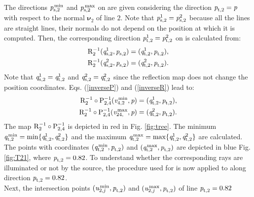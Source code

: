  The directions
$\textit{p}_{\textrm{s,} \textit{$2$}}^\textrm{\,min}$ and $\textit{p}_{\textrm{s,} \textit{$2$}}^\textrm{\,max} $ on 
are given considering the direction $\textit{p}_{\textrm{t,} \textit{$2$}} = \textit{p}_{\textrm{} \textit{}}$ with respect to the normal
$\boldsymbol{\nu}_{2}$ of line $2$.
 Note that $\textit{p}_{\textrm{s,} \textit{$2$}}^1=\textit{p}_{\textrm{s,} \textit{$2$}}^2$ because all the lines are straight lines, their normals do not depend on the position at which it is computed.
 Then, the corresponding direction $\textit{p}_{\textrm{t,} \textit{$2$}}^1=\textit{p}_{\textrm{t,} \textit{$2$}}^2$ on 
 is calculated from:
\begin{equation}\label{inverseR}
\begin{split}
\mathrm{R}_{{2}}^{-1}(\textit{q}_{\textrm{s,} \textit{$2$}}^1, \textit{p}_{\textrm{s,} \textit{$2$}}) &= (\textit{q}_{\textrm{t,} \textit{$2$}}^1, \textit{p}_{\textrm{t,} \textit{$2$}}), \\
\mathrm{R}_{{2}}^{-1}(\textit{q}_{\textrm{s,} \textit{$2$}}^2, \textit{p}_{\textrm{s,} \textit{$2$}}) &= (\textit{q}_{\textrm{t,} \textit{$2$}}^2, \textit{p}_{\textrm{t,} \textit{$2$}}).
\end{split}
\end{equation}
Note that $\textit{q}_{\textrm{s,} \textit{$2$}}^1 = \textit{q}_{\textrm{t,} \textit{$2$}}^1$ and $\textit{q}_{\textrm{s,} \textit{$2$}}^2= \textit{q}_{\textrm{t,} \textit{$2$}}^2$ since the reflection map does not change the position coordinates.
 Eqs. (\ref{inverseP}) and (\ref{inverseR}) lead to: \begin{equation}
\begin{split}
\mathrm{R}_{{2}}^{-1}\circ \mathrm{P}_{{2,4}}^{-1}(\textit{v}_{4,2}^\textrm{\,min}, \textit{p}) &= (\textit{q}_{\textrm{t,} \textit{$2$}}^1, \textit{p}_{\textrm{t,} \textit{$2$}}),\\
\mathrm{R}_{{2}}^{-1}\circ \mathrm{P}_{{2,4}}^{-1}(\textit{v}_{24,}^\textrm{\,max}, \textit{p}) &= (\textit{q}_{\textrm{t,} \textit{$2$}}^2, \textit{p}_{\textrm{t,} \textit{$2$}}).
\end{split}
\end{equation} The map $\mathrm{R}_{{2}}^{-1}\circ \mathrm{P}_{{2,4}}^{-1}$  is depicted in red in Fig. \ref{fig:tree}.
The minimum 
 $\textit{q}_{\textrm{t,} \textit{$2$}}^\textrm{\,min} = \min\{\textit{q}_{\textrm{t,} \textit{$2$}}^1, \textit{q}_{\textrm{t,} \textit{$2$}}^2\}$ and the maximum
 $\textit{q}_{\textrm{t,} \textit{$2$}}^\textrm{\,max} = \max\{\textit{q}_{\textrm{t,} \textit{$2$}}^1, \textit{q}_{\textrm{t,} \textit{$2$}}^2\}$ are calculated. The points with coordinates  $(\textit{q}_{\textrm{t,} \textit{$2$}}^\textrm{\,min}, \textit{p}_{\textrm{t,} \textit{$2$}})$  and  $(\textit{q}_{\textrm{t,} \textit{$2$}}^\textrm{\,max}, \textit{p}_{\textrm{t,} \textit{$2$}})$  are depicted in blue Fig. \ref{fig:T21}, where $\textit{p}_{\textrm{t,} \textit{$2$}}=0.82$.
 To understand whether the corresponding rays are illuminated or not by the source, the procedure used for
  is now applied to 
 along direction $\textit{p}_{\textrm{t,} \textit{$2$}}=0.82$. \\ \indent
  Next, the intersection points $(\textit{u}_{2,\textit{j}}^\textrm{\,min}, \textit{p}_{\textrm{t,} \textit{$2$}})$ and
$(\textit{u}_{2,\textit{j}}^\textrm{\,max}, \textit{p}_{\textrm{t,} \textit{$2$}})$
of line $\textit{p}_{\textrm{t,} \textit{$2$}}= 0.82$

